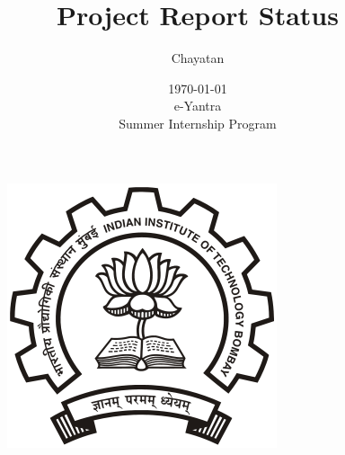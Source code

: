 \documentclass[a4paper,12 pt]{article}
\begin{document}
\begin{figure}[t]
\begin{center}
\includegraphics[]{iitb.png}
\end{center}
\end{figure}
\title{\textbf{Project Report Status}}
\author{Chayatan}
\date{\today \\ e-Yantra \\ Summer Internship Program   }
\maketitle
\pagebreak
\end{document}
